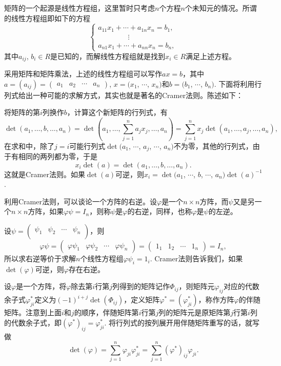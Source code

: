 \para 矩阵的一个起源是线性方程组，这里暂时只考虑$n$个方程$n$个未知元的情况。所谓的线性方程组即如下的方程
\[
	\begin{cases}
	a_{11}x_1+\cdots+a_{1n}x_n=b_1,\\
	\qquad\qquad\,\vdots\\
	a_{n1}x_1+\cdots+a_{nn}x_n=b_n,
	\end{cases}
\]
其中$a_{ij}$, $b_i\in R$是已知的，而解线性方程组就是找到$x_i\in R$满足上述方程。

采用矩阵和矩阵乘法，上述的线性方程组可以写作$ax=b$，其中$a=(a_{ij})=\begin{pmatrix}a_{1} & a_{2} & \cdots & a_{n}\end{pmatrix}$, $x=(x_1$, $\cdots$, $x_n)$和$b=(b_1$, $\cdots$, $b_n)$. 下面将利用行列式给出一种可能的求解方式，其实也就是著名的Cramer法则。陈述如下：

将矩阵的第$i$列换作$b$，计算这个新矩阵的行列式，有
\[
	\det(a_1,\dots,b,\dots,a_n)=\det\left(a_1,\dots,\sum_{j=1}^na_j x_j,\dots,a_n\right)=\sum_{j=1}^n x_j \det(a_1,\dots,a_j,\dots,a_n),
\]
在求和中，除了$j=i$可能行列式$\det(a_1$, $\cdots$, $a_j$, $\cdots$, $a_n)$不为零，其他的行列式，由于有相同的两列都为零，于是
\[
	x_i \det(a)=\det(a_1,\dots,b,\dots,a_n).
\]
这就是Cramer法则。如果$\det(a)$可逆，则$x_i=\det(a_1$, $\cdots$, $b$, $\cdots$, $a_n)\det(a)^{-1}$.

\para 利用Cramer法则，可以谈论一个方阵的右逆。设$\varphi$是一个$n\times n$方阵，而$\psi$又是另一个$n\times n$方阵，如果$\varphi\psi=I_n$，则称$\psi$是$\varphi$的右逆，同样，也称$\varphi$是$\psi$的左逆。

设$\psi=\begin{pmatrix}\psi_{1} & \psi_{2} & \cdots & \psi_{n}\\\end{pmatrix}$，则
\[
	\varphi\psi=\begin{pmatrix}\varphi\psi_{1} & \varphi\psi_{2} & \cdots & \varphi\psi_{n}\end{pmatrix}=\begin{pmatrix}1_{1} & 1_{2} & \cdots & 1_{n}\end{pmatrix}=I_n,
\]
所以求右逆等价于求解$n$个线性方程组$\varphi\psi_i=1_i$. Cramer法则告诉我们，如果$\det(\varphi)$可逆，则$\varphi$存在右逆。

\para 设$\varphi$是一个方阵，将$\varphi$除去第$i$行第$j$列得到的矩阵记作$\Phi_{ij}$，则矩阵元$\varphi_{ij}$对应的代数余子式$\varphi_{ji}^*$定义为$(-1)^{i+j}\det(\Phi_{ij})$，定义矩阵$\varphi^*=(\varphi_{ji}^*)$，称作方阵$\varphi$的伴随矩阵。注意到上面$i$和$j$的顺序，伴随矩阵第$i$行第$j$列的矩阵元是原矩阵第$j$行第$i$列的代数余子式，即$(\varphi^*)_{ij}=\varphi_{ji}^*$. 将行列式的按列展开用伴随矩阵重写的话，就写做
\[
	\det(\varphi)=\sum_{j=1}^n\varphi_{ji}\varphi_{ji}^*=\sum_{j=1}^n(\varphi^*)_{ij}\varphi_{ji}.
\]


